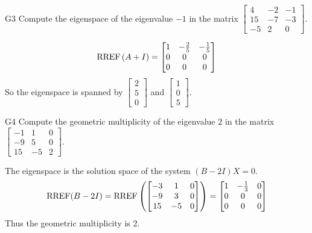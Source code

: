 \documentclass{sbgLAquiz}
\begin{document}
\begin{problem}{G3}
Compute the eigenspace of the eigenvalue $-1$ in the matrix $\begin{bmatrix} 4 & -2 & -1 \\ 15 & -7 & -3 \\ -5 & 2 & 0 \end{bmatrix}$. 
\end{problem}
\begin{solution}
$$\operatorname{RREF}\left(A+I\right) = \begin{bmatrix} 1 & - \frac{2}{5} & -\frac{1}{5} \\ 0 & 0 & 0 \\ 0 & 0 & 0 \end{bmatrix}$$
So the eigenspace is spanned by $\begin{bmatrix} 2 \\5 \\  0 \end{bmatrix}$ and $\begin{bmatrix} 1 \\ 0 \\ 5 \end{bmatrix}$.
\end{solution}


\begin{extract}\newpage\end{extract}
\begin{problem}{G4}
Compute the geometric multiplicity of the eigenvalue $2$ in the matrix $\begin{bmatrix} -1 & 1 & 0 \\ -9 & 5 & 0 \\ 15 & -5 & 2 \end{bmatrix}$.
\end{problem}

\begin{solution}
The eigenspace is the solution space of the system $(B-2I)X=0$.
$$\operatorname{RREF}(B-2I)=\operatorname{RREF}\left(\begin{bmatrix} -3 & 1 & 0 \\ -9 & 3 & 0 \\ 15 & - 5 & 0 \end{bmatrix} \right) = \begin{bmatrix} 1 & -\frac{1}{3} & 0 \\ 0 & 0 & 0 \\ 0 & 0 & 0 \end{bmatrix}$$
Thus the geometric multiplicity is 2.
\end{solution}
\end{document}
